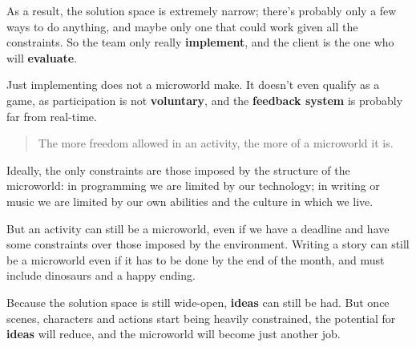 As a result, the solution space is extremely narrow; there's probably
only a few ways to do anything, and maybe only one that could work given
all the constraints. So the team only really \textbf{implement}, and the
client is the one who will \textbf{evaluate}.

Just implementing does not a microworld make. It doesn't even qualify as
a game, as participation is not \textbf{voluntary}, and the
\textbf{feedback system} is probably far from real-time.

\begin{quote}
The more freedom allowed in an activity, the more of a microworld it is.
\end{quote}

Ideally, the only constraints are those imposed by the structure of the
microworld: in programming we are limited by our technology; in writing
or music we are limited by our own abilities and the culture in which we
live.

But an activity can still be a microworld, even if we have a deadline
and have some constraints over those imposed by the environment. Writing
a story can still be a microworld even if it has to be done by the end
of the month, and must include dinosaurs and a happy ending.

Because the solution space is still wide-open, \textbf{ideas} can still
be had. But once scenes, characters and actions start being heavily
constrained, the potential for \textbf{ideas} will reduce, and the
microworld will become just another job.
